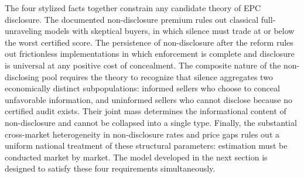 The four stylized facts together constrain any candidate theory of EPC disclosure. The documented non-disclosure premium rules out classical full-unraveling models with skeptical buyers, in which silence must trade at or below the worst certified score. The persistence of non-disclosure after the reform rules out frictionless implementations in which enforcement is complete and disclosure is universal at any positive cost of concealment. The composite nature of the non-disclosing pool requires the theory to recognize that silence aggregates two economically distinct subpopulations: informed sellers who choose to conceal unfavorable information, and uninformed sellers who cannot disclose because no certified audit exists. Their joint mass determines the informational content of non-disclosure and cannot be collapsed into a single type. Finally, the substantial cross-market heterogeneity in non-disclosure rates and price gaps rules out a uniform national treatment of these structural parameters: estimation must be conducted market by market. The model developed in the next section is designed to satisfy these four requirements simultaneously.
